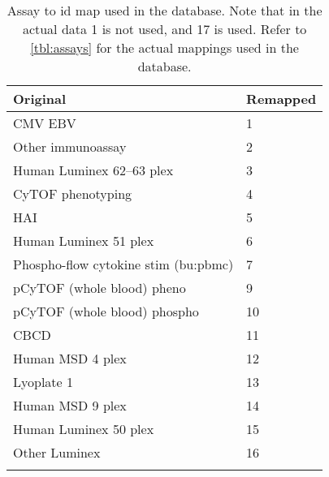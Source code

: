 \begin{appendices}
    \begin{table}[htpb]
        \begin{tabular}{ll}
            \toprule{}
            Original & Remapped \\
            \midrule{}
            CMV EBV & 1 \\
            Other immunoassay & 2 \\
            Human Luminex 62–63 plex & 3 \\
            CyTOF phenotyping & 4 \\
            HAI & 5 \\
            Human Luminex 51 plex & 6 \\
            Phospho-flow cytokine stim (\gls{bu:pbmc}) & 7 \\
            pCyTOF (whole blood) pheno & 9 \\
            pCyTOF (whole blood) phospho & 10 \\
            CBCD & 11 \\
            Human MSD 4 plex & 12 \\
            Lyoplate 1 & 13 \\
            Human MSD 9 plex & 14 \\
            Human Luminex 50 plex & 15 \\
            Other Luminex & 16 \\
            \bottomrule{}
        \end{tabular}
        \caption{
            Assay to id map used in the \flup database.
            Note that in the actual data 1 is not used, and 17 is used.
            Refer to \autoref{tbl:assays} for the actual mappings used in the database.
        }\label{tbl:remapAssays}
    \end{table}
\end{appendices}


